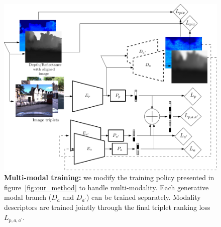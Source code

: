 \begin{figure}
	\centering
	
	\includegraphics[width=\linewidth]{reflectance/multimod_training}
	
	\caption[Multi-modal training pipeline]{\label{fig:multi_mod} \textbf{Multi-modal training:} we modify the training policy presented in figure~\ref{fig:our_method} to handle multi-modality. Each generative modal branch ($D_a$ and $D_{a^\prime}$) can be trained separately. Modality descriptors are trained jointly through the final triplet ranking loss $L_{p, a, a^\prime}$.}
	
\end{figure}